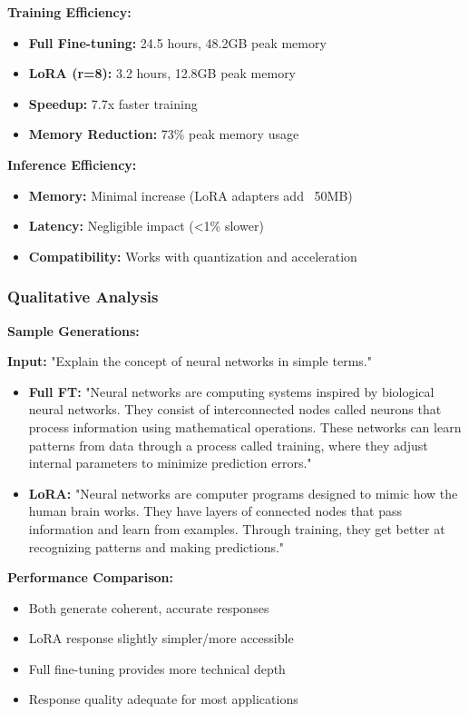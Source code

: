 \documentclass[conference]{IEEEtran}
\begin{document}
\textbf{Training Efficiency:}
\begin{itemize}
  \item \textbf{Full Fine-tuning:} 24.5 hours, 48.2GB peak memory
  \item \textbf{LoRA (r=8):} 3.2 hours, 12.8GB peak memory
  \item \textbf{Speedup:} 7.7x faster training
  \item \textbf{Memory Reduction:} 73\% peak memory usage
\end{itemize}

\textbf{Inference Efficiency:}
\begin{itemize}
  \item \textbf{Memory:} Minimal increase (LoRA adapters add ~50MB)
  \item \textbf{Latency:} Negligible impact (<1\% slower)
  \item \textbf{Compatibility:} Works with quantization and acceleration
\end{itemize}

\subsubsection{Qualitative Analysis}
\label{sec:q3_qualitative}

\textbf{Sample Generations:}

\textbf{Input:} "Explain the concept of neural networks in simple terms."
\begin{itemize}
  \item \textbf{Full FT:} "Neural networks are computing systems inspired by biological neural networks. They consist of interconnected nodes called neurons that process information using mathematical operations. These networks can learn patterns from data through a process called training, where they adjust internal parameters to minimize prediction errors."
  \item \textbf{LoRA:} "Neural networks are computer programs designed to mimic how the human brain works. They have layers of connected nodes that pass information and learn from examples. Through training, they get better at recognizing patterns and making predictions."
\end{itemize}

\textbf{Performance Comparison:}
\begin{itemize}
  \item Both generate coherent, accurate responses
  \item LoRA response slightly simpler/more accessible
  \item Full fine-tuning provides more technical depth
  \item Response quality adequate for most applications
\end{itemize}
\end{document}
